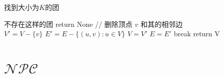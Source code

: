 \documentclass[]{article}
\begin{document}
\section{}

\section{}
	
\begin{algorithm}[H]
	\caption{找到大小为$ K $的团}
	{
		不存在这样的团\;	
		return None\;	
	}
	{
		// 删除顶点 $ v $ 和其的相邻边\\
		$ V' = V - \{ v\} $\;
		$ E' = E - \{(u, v):u \in V\} $\;
		{
			$ V = V' $\;
			$ E = E' $\;
		}
		{
			break\;
		}
	}
	return V \;
\end{algorithm}

\section{$ \mathcal{NPC}$}

\section{}
\end{document}
